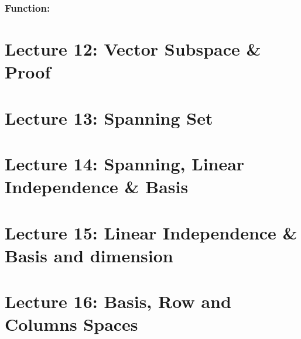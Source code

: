\documentclass[oneside]{book}
\begin{document}
\subsubsection{Function:}
\newpage
\section{Lecture 12: Vector Subspace \& Proof}





































\newpage
\section{Lecture 13: Spanning Set}


\section{Lecture 14: Spanning, Linear Independence \& Basis}

\section{Lecture 15: Linear Independence \& Basis and dimension}

\section{Lecture 16: Basis, Row and Columns Spaces}
\newpage
\end{document}

